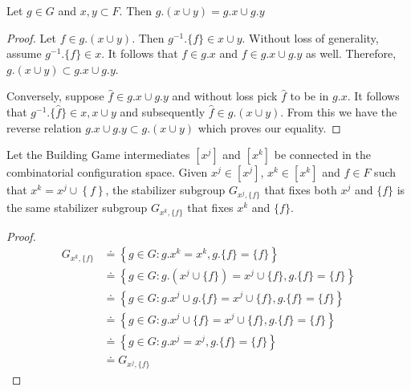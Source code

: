 \begin{mylem}
Let $g \in G$ and $x,y \subset F$. Then $g.(x\cup y) = g.x \cup g.y$
\end{mylem}
\begin{proof}
Let $f \in g.(x\cup y)$. Then $g^{-1}.\{f\} \in x \cup y$. Without loss of generality, assume $g^{-1}.\{f\} \in x$. It follows that $f \in g.x$ and $f \in g.x \cup g.y$ as well. Therefore, $g.(x\cup y) \subset g.x \cup g.y$.

Conversely, suppose $\hat{f} \in g.x \cup g.y$ and without loss pick $\hat{f}$ to be in $g.x$. It follows that $g^{-1}.\{\hat{f}\} \in x, x \cup y$ and subsequently $\hat{f} \in g.(x \cup y)$. From this we have the reverse relation $g.x \cup g.y \subset g.(x\cup y)$ which proves our equality.
\end{proof}


\begin{mylem}
\label{lem:I}
Let the Building Game intermediates $[x^j]$ and $[x^k]$ be connected in the combinatorial configuration space. Given $x^j \in [x^j]$, $x^k \in [x^k]$ and $f \in F$ such that $x^k = x^j \cup \left\{f\right\}$, the stabilizer subgroup $G_{x^j,\{f\}}$ that fixes both $x^j$ and $\{f\}$ is the same stabilizer subgroup $G_{x^k,\{f\}}$ that fixes $x^k$ and $\{f\}$.
\end{mylem}
\begin{proof}
\begin{align}
G_{x^k,\{f\}} &\doteq \left\{g \in G : g.x^k = x^k, g.\{f\} = \{f\} \right\} \\
           &\doteq \left\{g \in G : g.(x^j \cup \{f\}) = x^j \cup \{f\}, g.\{f\} = \{f\} \right\} \\
           &\doteq \left\{g \in G : g.x^j \cup g.\{f\} = x^j \cup \{f\}, g.\{f\} = \{f\} \right\} \\
           &\doteq \left\{g \in G : g.x^j \cup \{f\} = x^j \cup \{f\}, g.\{f\} = \{f\} \right\} \\
           &\doteq \left\{g \in G : g.x^j  = x^j, g.\{f\} = \{f\} \right\} \\
           &\doteq G_{x^j,\{f\}}
\end{align}
\end{proof}


